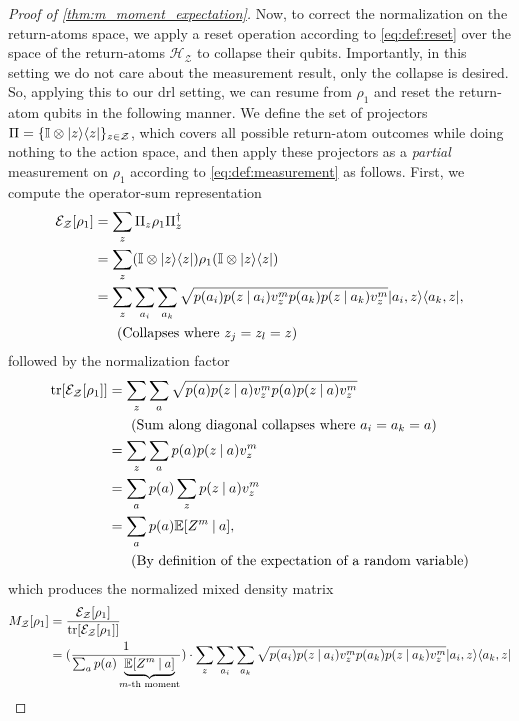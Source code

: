 \documentclass{article}
\DeclarePairedDelimiter{\bra}{\langle}{\rvert} %
\DeclarePairedDelimiter{\ket}{\lvert}{\rangle} %
\DeclarePairedDelimiter{\paren}{\lparen}{\rparen} %
\DeclarePairedDelimiter{\bparen}{[}{]} %
\newcommand{\E}{\mathbb{E}} %
\newcommand{\hilbert}{\mathcal{H}} %
\newcommand{\bfunc}[2]{#1\bparen*{#2}} %
\newcommand{\given}[1][]{\:#1\vert\:}
\begin{document}
\begin{proof}[Proof of \cref{thm:m_moment_expectation}]
Now, to correct the normalization on the return-atoms space, we apply a reset operation according to \cref{eq:def:reset} over the space of the return-atoms $\hilbert_{\mathcal{Z}}$ to collapse their qubits.
% 
Importantly, in this setting we do not care about the measurement result, only the collapse is desired.
% 
So, applying this to our \ac{drl} setting, we can resume from $\rho_1$ and reset the return-atom qubits in the following manner. We define the set of projectors $\Pi = \{ \mathbb{I}\otimes\ket{z}\bra{z} \}_{z\in \mathcal{Z}}$, which covers all possible return-atom outcomes while doing nothing to the action space, and then apply these projectors as a \emph{partial} measurement on $\rho_1$ according to \cref{eq:def:measurement} as follows. First, we compute the operator-sum representation
%
\begin{align}
\bfunc{\mathcal{E}_{\mathcal{Z}}}{\rho_1}
&= \sum_{z} \Pi_z \rho_1 \Pi^{\dagger}_z
\\&= \sum_{z} \paren*{\mathbb{I}\otimes\ket{z}\bra{z}} \rho_1 \paren*{\mathbb{I}\otimes\ket{z}\bra{z}}
\\&= \sum_{z} \sum_{a_i} \sum_{a_k} \sqrt{p(a_i) p(z \given a_i) v_{z}^{m} p(a_k) p(z \given a_k) v_{z}^{m}} \ket{a_i, z} \bra{a_k, z},
\\&~~~~~\textrm{(Collapses where} ~ z_j=z_l=z \textrm{)}\nonumber
\end{align}
%
followed by the normalization factor
%
\begin{align}
\bfunc{\textrm{tr}}{\bfunc{\mathcal{E}_{\mathcal{Z}}}{\rho_1}}
&= \sum_{z} \sum_{a} \sqrt{p(a) p(z \given a) v_{z}^{m} p(a) p(z \given a) v_{z}^{m}}
\\&~~~~~\textrm{(Sum along diagonal collapses where} ~ a_i=a_k=a \textrm{)} \nonumber
\\&= \sum_{z} \sum_{a} p(a) p(z \given a) v_{z}^{m}
\\&= \sum_{a} p(a) \sum_{z} p(z \given a) v_{z}^{m}
\\&= \sum_{a} p(a) \bfunc{\mathbb{E}}{Z^{m} \given a},
\\&~~~~~\textrm{(By definition of the expectation of a random variable)} \nonumber
\end{align}
%
which produces the normalized mixed density matrix
%
\begin{align}
\bfunc{M_{\mathcal{Z}}}{\rho_1}
&= \frac{\bfunc{\mathcal{E}_{\mathcal{Z}}}{\rho_1}}{\bfunc{\textrm{tr}}{\bfunc{\mathcal{E}_{\mathcal{Z}}}{\rho_1}}}
\\&= (\frac{1}{\sum_{a} p(a) \underbrace{\bfunc{\mathbb{E}}{Z^{m} \given a}}_{\textrm{$m$-th moment}}}) \cdot \sum_{z} \sum_{a_i} \sum_{a_k} \sqrt{p(a_i) p(z \given a_i) v_{z}^{m} p(a_k) p(z \given a_k) v_{z}^{m}} \ket{a_i, z} \bra{a_k, z}

\end{align}
\end{proof}
\end{document}
